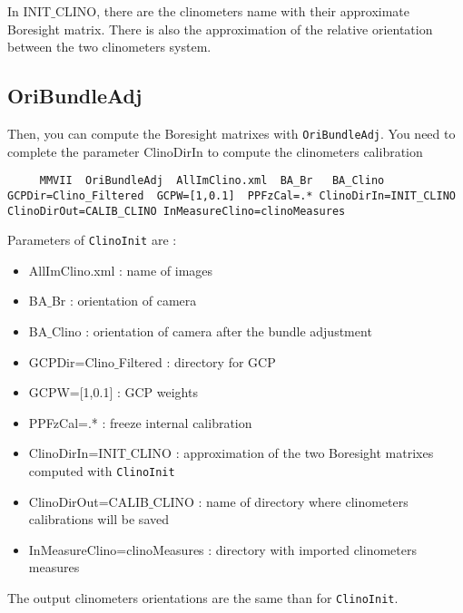 In INIT$\_$CLINO, there are the clinometers name with their approximate Boresight matrix. There is also the approximation of the relative orientation between the two clinometers system.



\subsection{OriBundleAdj}

Then, you can compute the Boresight matrixes with {\tt OriBundleAdj}. You need to complete the parameter ClinoDirIn to compute the clinometers calibration

\begin{lstlisting}
     MMVII  OriBundleAdj  AllImClino.xml  BA_Br   BA_Clino   GCPDir=Clino_Filtered  GCPW=[1,0.1]  PPFzCal=.* ClinoDirIn=INIT_CLINO ClinoDirOut=CALIB_CLINO InMeasureClino=clinoMeasures
\end{lstlisting}

Parameters of {\tt ClinoInit} are :
\begin{itemize}
     \item AllImClino.xml : name of images
     \item BA$\_$Br : orientation of camera
     \item BA$\_$Clino : orientation of camera after the bundle adjustment
     \item GCPDir=Clino$\_$Filtered : directory for GCP
     \item GCPW=[1,0.1] : GCP weights
     \item PPFzCal=.* : freeze internal calibration
     \item ClinoDirIn=INIT$\_$CLINO : approximation of the two Boresight matrixes computed with {\tt ClinoInit}
     \item ClinoDirOut=CALIB$\_$CLINO : name of directory where clinometers calibrations will be saved
     \item InMeasureClino=clinoMeasures : directory with imported clinometers measures
\end{itemize}

The output clinometers orientations are the same than for {\tt ClinoInit}.

